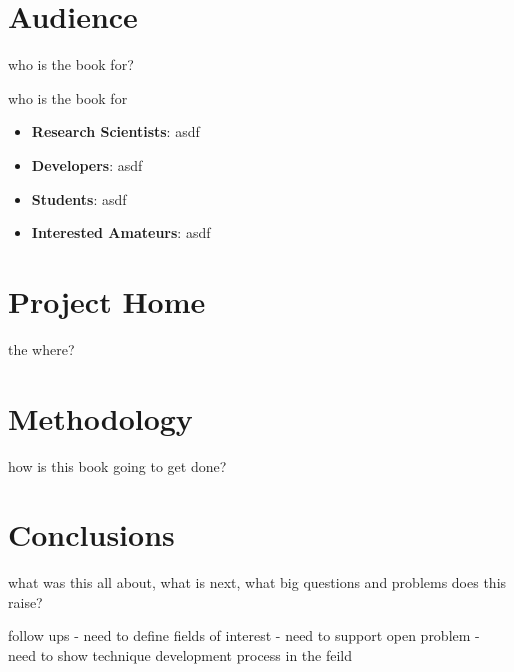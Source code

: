 \documentclass[a4paper, 11pt]{article}
\begin{document}
\section{Audience}
\label{sec:audience}
who is the book for?

who is the book for 

\begin{itemize}
	\item \textbf{Research Scientists}: asdf
	\item \textbf{Developers}: asdf
	\item \textbf{Students}: asdf
	\item \textbf{Interested Amateurs}: asdf
\end{itemize}


\section{Project Home}
the where?

\section{Methodology}
\label{sec:methodology}
how is this book going to get done?


\section{Conclusions}
\label{sec:conclusions}
what was this all about, what is next, what big questions and problems does this raise?


follow ups
- need to define fields of interest
- need to support open problem
- need to show technique development process in the feild
\end{document}

